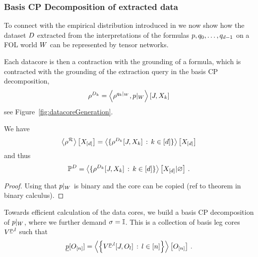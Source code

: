 \subsubsection{Basis CP Decomposition of extracted data}

To connect with the empirical distribution introduced in  we now show how the dataset $D$ extracted from the interpretations of the formulas $p,q_{0},\ldots,q_{d-1}$ on a FOL world $W$ can be represented by tensor networks.



Each datacore is then a contraction with the grounding of a formula, which is contracted with the grounding of the extraction query in the basis CP decomposition, 
\begin{align*}
	\rho^{D_{k}} = \left\langle \rho^{{q_{k}}|_{W}},{p}|_{W}\right\rangle \left[ J,X_{k} \right] 
\end{align*}
see Figure~\ref{fig:datacoreGeneration}.

\begin{theorem}	
	We have
		\[ 	\left\langle \rho^{\mathcal{R}}\right\rangle \left[ X_{[d]} \right] 
		= \left\langle \{\rho^{D_{k}}[J,X_{k}] \, : \, k\in[d]\}\right\rangle \left[ X_{[d]} \right] \]
	and thus 
		\[  \mathbb{P}^{D} = \left\langle \{\rho^{D_{k}}[J,X_{k}]  \, : \, k\in[d]\}\right\rangle \left[ X_{[d]} | \varnothing \right] \, . \]
\end{theorem}
\begin{proof}
	Using that ${p}|_{W}$ is binary and the core can be copied (ref to theorem in binary calculus).
\end{proof}

Towards efficient calculation of the data cores, we build a basis CP decomposition of ${p}|_{W}$, where we further demand $\sigma=\mathbb{I}$.
This is a collection of basis leg cores $V^{\underline{p},l}$ such that
\begin{align*}
	\underline{p}[O_{[n]}] = \left\langle  \left\{ V^{\underline{p},l}[J,O_{l}] \, : \, l\in[n] \right\} \right\rangle \left[ O_{[n]} \right] \, . 
\end{align*}

